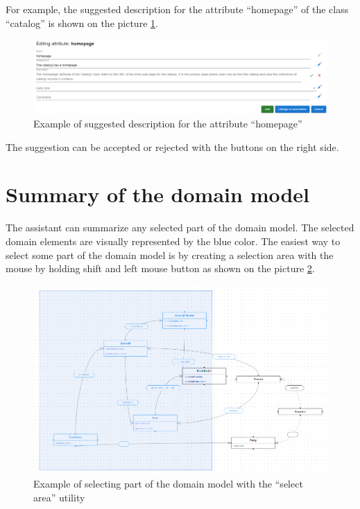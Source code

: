 For example, the suggested description for the attribute ``homepage'' of the class ``catalog'' is shown on the picture \ref{fig:suggested_single_field}.

\begin{figure}[!h]
    \includegraphics[scale=0.35]{../docs/images/frontend/suggested-single-field.png}
    \caption{\centering Example of suggested description for the attribute ``homepage''}
    \label{fig:suggested_single_field}
\end{figure}

The suggestion can be accepted or rejected with the buttons on the right side.


\section{Summary of the domain model}

The assistant can summarize any selected part of the domain model. The selected domain elements are visually represented by the blue color. The easiest way to select some part of the domain model is by creating a selection area with the mouse by holding shift and left mouse button as shown on the picture \ref{fig:selection}.

\begin{figure}[!h]
    \includegraphics[scale=0.4]{../docs/images/frontend/selection.png}
    \caption{\centering Example of selecting part of the domain model with the ``select area'' utility}
    \label{fig:selection}
\end{figure}

